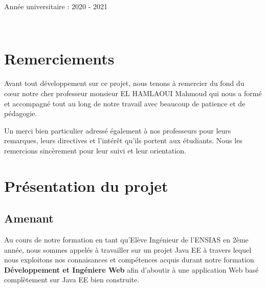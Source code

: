 \documentclass[a4paper]{report}
\begin{document}
\begin{spacing}{2}
\begin{titlepage}
\begin{center}
\vfill

{\large Année universitaire : 2020 - 2021}

\end{center}
\end{titlepage}

\newpage
\thispagestyle{empty}
~
\newpage
\thispagestyle{empty}
\tableofcontents
\thispagestyle{empty}
\listoffigures
\thispagestyle{empty}
\setcounter{page}{0}

\newpage

\renewcommand{\arraystretch}{1}








\chapter*{Remerciements}

Avant tout développement sur ce projet, nous tenons à remercier du fond du cœur notre cher professeur monsieur EL HAMLAOUI Mahmoud qui nous a formé et accompagné  tout au long de notre travail avec beaucoup de patience et de pédagogie.

Un merci bien particulier adressé également à nos professeurs pour leurs remarques, leurs directives et l'intérêt qu'ils portent aux étudiants. Nous les remercions sincèrement pour leur suivi et leur orientation.


\chapter{Présentation du projet}
\section{Amenant}

\par 
Au cours de notre formation en tant qu'Elève Ingénieur de l'ENSIAS en 2ème année, nous sommes appelés à travailler sur un projet Java EE à travers lequel nous exploitons nos connaisances et compétences acquis durant notre formation \textbf{Développement et Ingéniere Web} afin d'aboutir à une application Web basé complètement sur Java EE bien construite. 


\end{spacing}
\end{document}
